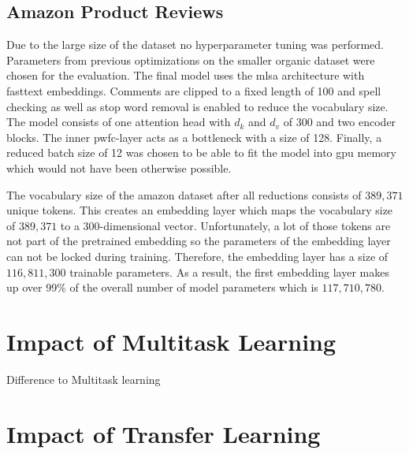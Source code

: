 \subsection{Amazon Product Reviews}
\label{sec:06_ResultsAmazon}

Due to the large size of the dataset no hyperparameter tuning was performed. Parameters from previous optimizations on the smaller organic dataset were chosen for the evaluation. The final model uses the \gls{mlsa} architecture with fasttext embeddings. Comments are clipped to a fixed length of 100 and spell checking as well as stop word removal is enabled to reduce the vocabulary size. The model consists of one attention head with $d_k$ and $d_v$ of 300 and two encoder blocks. The inner \gls{pwfc}-layer acts as a bottleneck with a size of 128. Finally, a reduced batch size of 12 was chosen to be able to fit the model into \gls{gpu} memory which would not have been otherwise possible.
\medskip

The vocabulary size of the amazon dataset after all reductions consists of $389,371$ unique tokens. This creates an embedding layer which maps the vocabulary size of $389,371$ to a 300-dimensional vector. Unfortunately, a lot of those tokens are not part of the pretrained embedding so the parameters of the embedding layer can not be locked during training. Therefore, the embedding layer has a size of $116,811,300$ trainable parameters. As a result, the first embedding layer makes up over 99\% of the overall number of model parameters which is $117,710,780$.



\section{Impact of Multitask Learning}
\label{sec:06_ResultsMultitask}

Difference to Multitask learning


\section{Impact of Transfer Learning}
\label{sec:06_ResultsTransfer}


